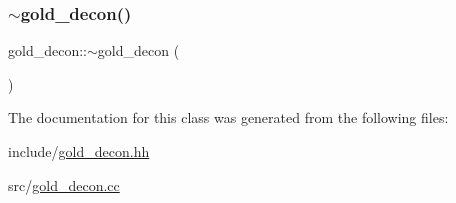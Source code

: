 \subsubsection{\texorpdfstring{$\sim$gold\+\_\+decon()}{~gold\_decon()}}
{\footnotesize\ttfamily gold\+\_\+decon\+::$\sim$gold\+\_\+decon (\begin{DoxyParamCaption}{ }\end{DoxyParamCaption})}



The documentation for this class was generated from the following files\+:\begin{DoxyCompactItemize}
\item 
include/\mbox{\hyperlink{gold__decon_8hh}{gold\+\_\+decon.\+hh}}\item 
src/\mbox{\hyperlink{gold__decon_8cc}{gold\+\_\+decon.\+cc}}\end{DoxyCompactItemize}
